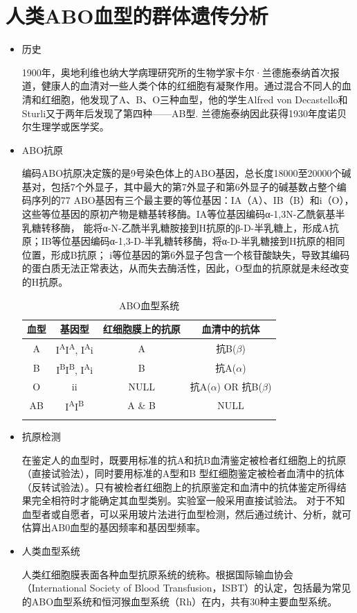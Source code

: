 \documentclass[AutoFakeBold]{LZUThesis}
\begin{document}
\section{人类ABO血型的群体遗传分析}
\begin{itemize}
    \item 历史\par
    1900年，奥地利维也纳大学病理研究所的生物学家卡尔·兰德施泰纳首次报道，健康人的血清对一些人类个体的红细胞有凝聚作用。通过混合不同人的血清和红细胞，他发现了A、B、O三种血型，他的学生Alfred von Decastello和Sturli又于两年后发现了第四种——AB型. 兰德施泰纳因此获得1930年度诺贝尔生理学或医学奖。

    \item ABO抗原\par
    编码ABO抗原决定簇的是9号染色体上的ABO基因，总长度18000至20000个碱基对，包括7个外显子，其中最大的第7外显子和第6外显子的碱基数占整个编码序列的77%
    ABO基因有三个最主要的等位基因：IA（A）、IB（B）和i（O），这些等位基因的原初产物是糖基转移酶。IA等位基因编码α-1,3N-乙酰氨基半乳糖转移酶，
    能将α-N-乙酰半乳糖胺接到H抗原的β-D-半乳糖上，形成A抗原；IB等位基因编码α-1,3-D-半乳糖转移酶，将α-D-半乳糖接到H抗原的相同位置，形成B抗原；
    i等位基因的第6外显子包含一个核苷酸缺失，导致其编码的蛋白质无法正常表达，从而失去酶活性，因此，O型血的抗原就是未经改变的H抗原。

    \begin{longtable}{cccc}
        \toprule
        血型 & 基因型 & 红细胞膜上的抗原 & 血清中的抗体 \\
        \midrule
        A & I\textsuperscript{A}I\textsuperscript{A}, I\textsuperscript{A}i & A & 抗B($\beta$) \\
        B & I\textsuperscript{B}I\textsuperscript{B}, I\textsuperscript{A}i & B & 抗A($\alpha$) \\
        O & ii & NULL & 抗A($\alpha$) OR 抗B($\beta$) \\
        AB & I\textsuperscript{A}I\textsuperscript{B} & A \& B & NULL \\
        \bottomrule
        \caption{ABO血型系统}
    \end{longtable}
    \item 抗原检测\par
    在鉴定人的血型时，既要用标准的抗A和抗B血清鉴定被检者红细胞上的抗原（直接试验法），同时要用标准的A型和B
    型红细胞鉴定被检者血清中的抗体（反转试验法）。只有被检者红细胞上的抗原鉴定和血清中的抗体鉴定所得结果完全相符时才能确定其血型类别。实验室一般采用直接试验法。
    对于不知血型者或自愿者，可以采用玻片法进行血型检测，然后通过统计、分析，就可估算出AB0血型的基因频率和基因型频率。

    \item 人类血型系统\par
    人类红细胞膜表面各种血型抗原系统的统称。根据国际输血协会（International Society of Blood
    Transfusion，ISBT）的认定，包括最为常见的ABO血型系统和恒河猴血型系统（Rh）在内，共有30种主要血型系统。
\end{itemize}
\end{document}
